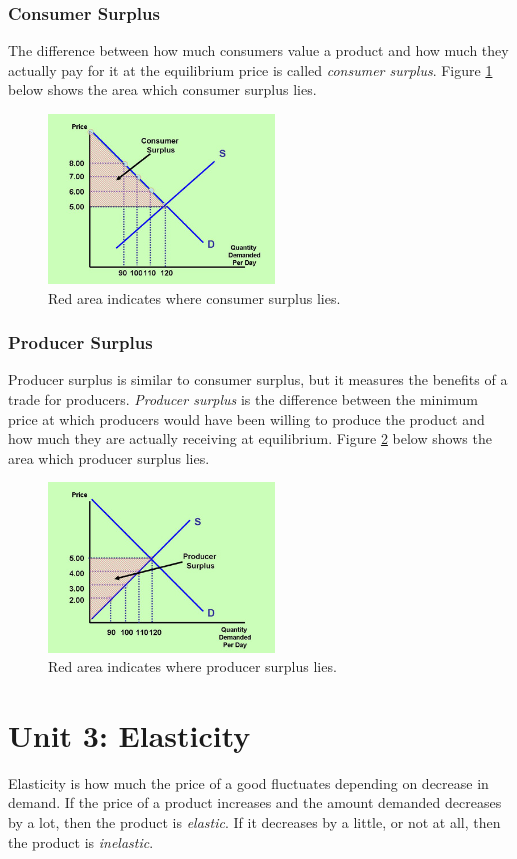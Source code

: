 \documentclass[a4paper, 12pt] {article}
\begin{document}
\subsubsection{Consumer Surplus}
The difference between how much consumers value a product and how much they
actually pay for it at the equilibrium price is called \emph{consumer surplus}.
Figure \ref{fig:consumer_suprlus} below shows the area which consumer surplus lies.
\begin{figure}[ht]
    \center
    \includegraphics[height=4.5cm, width=6cm]{consumer_surplus.jpg}
    \caption{Red area indicates where consumer surplus lies.}
    \label{fig:consumer_suprlus}
\end{figure}

\subsubsection{Producer Surplus}
Producer surplus is similar to consumer surplus, but it measures the benefits
of a trade for producers. \emph{Producer surplus} is the difference between the
minimum price at which producers would have been willing to produce the product
and how much they are actually receiving at equilibrium.
Figure \ref{fig:producer_surplus} below shows the area which producer surplus lies.
\begin{figure}[ht]
    \center
    \includegraphics[height=4.5cm, width=6cm]{producer_surplus.jpg}
    \caption{Red area indicates where producer surplus lies.}
    \label{fig:producer_surplus}
\end{figure}

\section{Unit 3: Elasticity}
Elasticity is how much the price of a good fluctuates depending on decrease in
demand. If the price of a product increases and the amount demanded decreases
by a lot, then the product is \emph{elastic}. If it decreases by a little, or
not at all, then the product is \emph{inelastic}.
\end{document}
